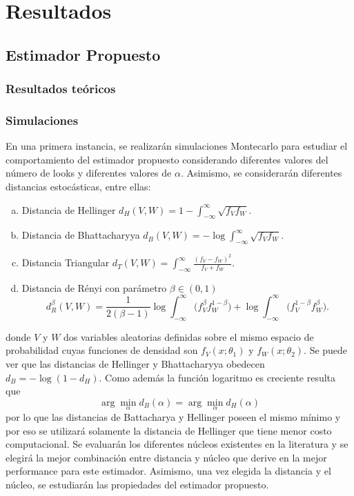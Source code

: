 
\chapter{Resultados}

\section{Estimador Propuesto}
\subsection{Resultados teóricos}
\subsection{Simulaciones}

En una primera instancia, se realizarán simulaciones Montecarlo para estudiar el comportamiento del estimador propuesto considerando diferentes valores del número de looks y diferentes valores de $\alpha$. Asimismo, se considerarán diferentes distancias estocásticas, entre ellas:

\begin{enumerate}[a)]
	\item Distancia de Hellinger $d_H(V,W)=1-\int_{-\infty}^{\infty}\sqrt{f_Vf_W}$.
	\item Distancia de Bhattacharyya $d_B(V,W)=-\log\int_{-\infty}^{\infty}\sqrt{f_Vf_W}$.
	\item Distancia Triangular $d_T(V,W)=\int_{-\infty}^{\infty}\frac{(f_V-f_W)^2}{f_V+f_W}$.
	\item Distancia de R\'enyi con parámetro $\beta\in(0,1)$
	$$
	d_R^{\beta}(V,W)=\frac{1}{2(\beta-1)}\log\int_{-\infty}^{\infty}\big({f_V^{\beta}f_W^{1-\beta})+\log\int_{-\infty}^{\infty}\big(f_V^{1-\beta}f_W^{\beta}}\big).
	$$
\end{enumerate}
donde $V$ y $W$ dos variables aleatorias definidas sobre el mismo espacio de probabilidad cuyas funciones de densidad son $f_V(x;\theta_1)$ y $f_W(x;\theta_2)$.
Se puede ver que las distancias de Hellinger y Bhattacharyya obedecen $d_B=-\log(1-d_H)$. Como además la función logaritmo es creciente resulta que $$\arg\min_\alpha d_B(\alpha )=\arg\min_ \alpha d_H(\alpha )$$ por lo que las distancias de Battacharya y Hellinger poseen el mismo mínimo y por eso se utilizará solamente la distancia de Hellinger que tiene menor costo computacional. Se evaluarán los diferentes núcleos existentes en la literatura y se elegirá la mejor combinación entre distancia y núcleo que derive en la mejor performance para este estimador. Asimismo, una vez elegida la distancia y el núcleo, se estudiarán las propiedades del estimador propuesto. 
